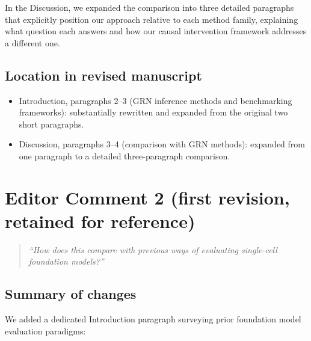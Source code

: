 \documentclass[11pt,letterpaper]{article}
\begin{document}
In the Discussion, we expanded the comparison into three detailed
paragraphs that explicitly position our approach relative to each
method family, explaining what question each answers and how our causal
intervention framework addresses a different one.

\subsection*{Location in revised manuscript}

\begin{itemize}[leftmargin=2em]
\item Introduction, paragraphs 2--3 (GRN inference methods and
  benchmarking frameworks): substantially rewritten and expanded from
  the original two short paragraphs.
\item Discussion, paragraphs 3--4 (comparison with GRN methods):
  expanded from one paragraph to a detailed three-paragraph comparison.
\end{itemize}

\bigskip

\section*{Editor Comment 2 (first revision, retained for reference)}

\begin{quote}
\textit{``How does this compare with previous ways of evaluating
single-cell foundation models?''}
\end{quote}

\subsection*{Summary of changes}

We added a dedicated Introduction paragraph surveying prior foundation
model evaluation paradigms:
\end{document}
